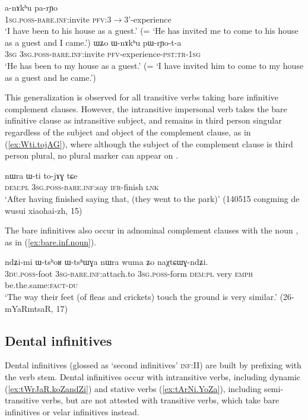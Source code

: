 \begin{exe}
\ex  \label{ex:nAkhu1}
\gll a-nɤkʰu pa-rɲo \\
\textsc{1sg.poss-bare.inf:}invite \textsc{pfv:3$\rightarrow$3'}-experience \\
\glt `I have been to his house as a guest.' (= `He has invited me to come to his house as a guest and I came.')
\ex  \label{ex:nAkhu2}
\gll ɯʑo ɯ-nɤkʰu pɯ-rɲo-t-a  \\
\textsc{3sg}  \textsc{3sg.poss-bare.inf:}invite \textsc{pfv}-experience-\textsc{pst:tr-1sg} \\
\glt `He has been to my house as a guest.' (= `I have invited him to come to my house as a guest and he came.')
\end{exe}

This generalization is observed for all transitive verbs taking bare infinitive complement clauses. However, the intransitive impersonal verb  takes the bare infinitive clause as intransitive subject, and remains in third person singular regardless of the subject and object of the complement clause, as in (\ref{ex:Wti.tojAG}), where although the subject of the complement clause is third person plural, no plural marker can appear on .

\begin{exe}
\ex \label{ex:Wti.tojAG}
\gll nɯra ɯ-ti to-jɤɣ tɕe \\
\textsc{dem:pl} \textsc{3sg.poss-bare.inf}:say \textsc{ifr}-finish \textsc{lnk}\\
\glt `After having finished saying that, (they went to the park)' (140515 congming de wusui xiaohai-zh, 15)
\end{exe}

The bare infinitives also occur in adnominal complement clauses with the noun , as in (\ref{ex:bare.inf.noun}).

\begin{exe}
\ex \label{ex:bare.inf.noun}
\gll ndʑi-mi ɯ-tsʰoʁ ɯ-tsʰɯɣa nɯra wuma ʑo naχtɕɯɣ-ndʑi.   \\
\textsc{3du.poss}-foot \textsc{3sg}-\textsc{bare.inf:}attach.to \textsc{3sg.poss}-form \textsc{dem:pl} very \textsc{emph} be.the.same:\textsc{fact}-\textsc{du}  \\
\glt `The way their feet (of fleas and crickets) touch the ground is very similar.' (26-mYaRmtsaR, 17)
\end{exe}


\subsection{Dental infinitives} \label{sec:dental.inf}
Dental infinitives (glossed as `second infinitives' \textsc{inf}:II) are built by prefixing  with the verb stem. Dental infinitives occur with intransitive verbs, including dynamic (\ref{ex:tWrJaR.koZandZi}) and stative verbs (\ref{ex:tArNi.YoZa}), including semi-transitive verbs, but are not attested with transitive verbs, which take bare infinitives or velar infinitives instead.

